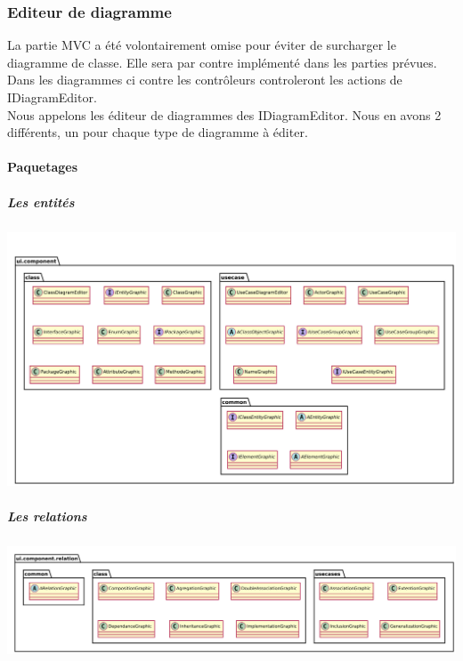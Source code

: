 \documentclass[a4paper,10pt]{article}
\begin{document}
    \subsubsection{Editeur de diagramme}
	La partie MVC a été volontairement omise pour éviter de surcharger le diagramme de classe. Elle sera 
	par contre implémenté dans les parties prévues.\\
	Dans les diagrammes ci contre les contrôleurs controleront les actions de IDiagramEditor.\\
	Nous appelons les éditeur de diagrammes des IDiagramEditor. Nous en avons 2 différents, un pour chaque type de diagramme à éditer.
	\paragraph{Paquetages}
	  \subparagraph{Les entités}
	  \begin{center}
	      \includegraphics[width=\textwidth]{Image/DiagramEditor_EntityPackage.png}
	  \end{center}
	  \subparagraph{Les relations}
	  \begin{center}
	      \includegraphics[width=\textwidth]{Image/DiagramEditor_RelationPackage.png}
	  \end{center}
	  
	  \newpage
\end{document}
